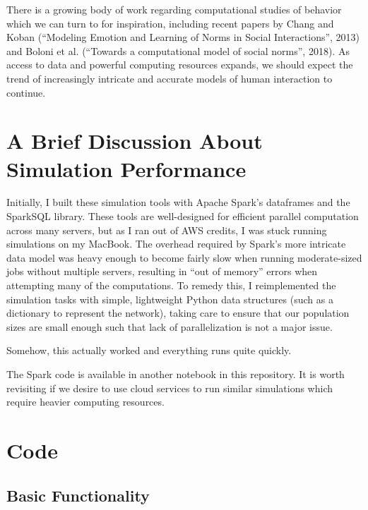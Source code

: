 \documentclass[11pt]{article}
\begin{document}
There is a growing body of work regarding computational studies of
behavior which we can turn to for inspiration, including recent papers
by Chang and Koban (``Modeling Emotion and Learning of Norms in Social
Interactions'', 2013) and Boloni et al. (``Towards a computational model
of social norms'', 2018). As access to data and powerful computing
resources expands, we should expect the trend of increasingly intricate
and accurate models of human interaction to continue.

    \hypertarget{a-brief-discussion-about-simulation-performance}{%
\section{A Brief Discussion About Simulation
Performance}\label{a-brief-discussion-about-simulation-performance}}

Initially, I built these simulation tools with Apache Spark's dataframes
and the SparkSQL library. These tools are well-designed for efficient
parallel computation across many servers, but as I ran out of AWS
credits, I was stuck running simulations on my MacBook. The overhead
required by Spark's more intricate data model was heavy enough to become
fairly slow when running moderate-sized jobs without multiple servers,
resulting in ``out of memory'' errors when attempting many of the
computations. To remedy this, I reimplemented the simulation tasks with
simple, lightweight Python data structures (such as a dictionary to
represent the network), taking care to ensure that our population sizes
are small enough such that lack of parallelization is not a major issue.

Somehow, this actually worked and everything runs quite quickly.

The Spark code is available in another notebook in this repository. It
is worth revisiting if we desire to use cloud services to run similar
simulations which require heavier computing resources.

    \hypertarget{code}{%
\section{Code}\label{code}}

\hypertarget{basic-functionality}{%
\subsection{Basic Functionality}\label{basic-functionality}}
\end{document}
